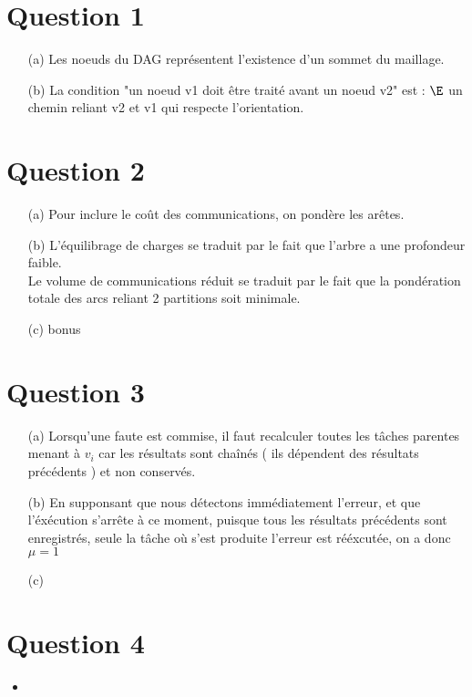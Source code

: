 \documentclass{report}
\begin{document}
\tableofcontents %

\vfill

\section{Question 1}

\begin{itemize}
	\item[(a)] Les noeuds du DAG représentent l'existence d'un sommet du maillage. 
	\item[(b)] La condition "un noeud v1 doit être traité avant un noeud v2" est : $\E$ un chemin reliant v2 et v1 qui respecte l'orientation.
\end{itemize}


\section{Question 2}

\begin{itemize}
	\item[(a)] Pour inclure le coût des communications, on pondère les arêtes.
	\item[(b)] L'équilibrage de charges se traduit par le fait que l'arbre a une profondeur faible. \\
	Le volume de communications réduit se traduit par le fait que la pondération totale des arcs reliant 2 partitions soit minimale. 
	\item[(c) bonus] 
\end{itemize}

\section{Question 3}

\begin{itemize}
	\item[(a)] Lorsqu'une faute est commise, il faut recalculer toutes les tâches parentes menant à $v_i$ car les résultats sont chaînés ( ils dépendent des résultats précédents ) et non conservés.
	\item[(b)] En supponsant que nous détectons immédiatement l'erreur, et que l'éxécution s'arrête à ce moment, puisque tous les résultats précédents sont enregistrés, seule la tâche où s'est produite l'erreur est rééxcutée, on a donc $\mu = 1$
	\item[(c)] 
\end{itemize}

\section{Question 4}

\begin{itemize}
	\item 
\end{itemize}
\end{document}
